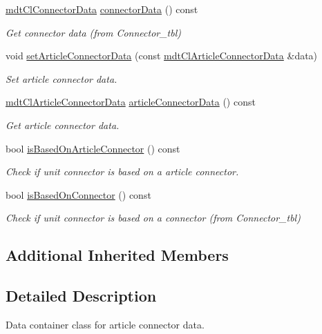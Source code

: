 \begin{DoxyCompactItemize}
\hyperlink{classmdt_cl_connector_data}{mdt\-Cl\-Connector\-Data} \hyperlink{classmdt_cl_unit_connector_data_a2b454946f0f09287ddd34b692ccc1c1b}{connector\-Data} () const 
\begin{DoxyCompactList}\small\item\em Get connector data (from Connector\-\_\-tbl) \end{DoxyCompactList}\item 
void \hyperlink{classmdt_cl_unit_connector_data_a5a9eae080f09216a482e58581e195e35}{set\-Article\-Connector\-Data} (const \hyperlink{classmdt_cl_article_connector_data}{mdt\-Cl\-Article\-Connector\-Data} \&data)
\begin{DoxyCompactList}\small\item\em Set article connector data. \end{DoxyCompactList}\item 
\hyperlink{classmdt_cl_article_connector_data}{mdt\-Cl\-Article\-Connector\-Data} \hyperlink{classmdt_cl_unit_connector_data_a3226d440ac8468c1bf5906943fac40c1}{article\-Connector\-Data} () const 
\begin{DoxyCompactList}\small\item\em Get article connector data. \end{DoxyCompactList}\item 
bool \hyperlink{classmdt_cl_unit_connector_data_a2b805d341aaffbf1bb5235ef753e58b6}{is\-Based\-On\-Article\-Connector} () const 
\begin{DoxyCompactList}\small\item\em Check if unit connector is based on a article connector. \end{DoxyCompactList}\item 
bool \hyperlink{classmdt_cl_unit_connector_data_aebec32027c53c788bf5fd564ba8dea67}{is\-Based\-On\-Connector} () const 
\begin{DoxyCompactList}\small\item\em Check if unit connector is based on a connector (from Connector\-\_\-tbl) \end{DoxyCompactList}\end{DoxyCompactItemize}
\subsection*{Additional Inherited Members}


\subsection{Detailed Description}
Data container class for article connector data. 

